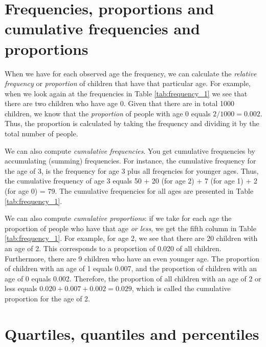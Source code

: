 \section{Frequencies, proportions and cumulative frequencies and proportions}


When we have for each observed age the frequency, we can calculate the \textit{relative frequency} or \textit{proportion} of children that have that particular age. For example, when we look again at the frequencies in Table \ref{tab:frequency_1} we see that there are two children who have age 0. Given that there are in total 1000 children, we know that the \textit{proportion} of people with age 0 equals $2/1000=0.002$. Thus, the proportion is calculated by taking the frequency and dividing it by the total number of people.


We can also compute \textit{cumulative frequencies}. You get cumulative frequencies by accumulating (summing) frequencies. For instance, the cumulative frequency for the age of 3, is the frequency for age 3 plus all freqencies for younger ages. Thus, the cumulative frequency of age 3 equals 50 + 20 (for age 2) + 7 (for age 1) + 2 (for age 0) = 79. The cumulative frequencies for all ages are presented in Table \ref{tab:frequency_1}.

We can also compute \textit{cumulative proportions}: if we take for each age the proportion of people who have that age \textit{or less}, we get the fifth column in Table \ref{tab:frequency_1}. For example, for age 2, we see that there are 20 children with an age of 2. This corresponds to a proportion of 0.020 of all children. Furthermore, there are 9 children who have an even younger age. The proportion of children with an age of 1 equals 0.007, and the proportion of children with an age of 0 equals 0.002. Therefore, the proportion of all children with an age of 2 or less equals $0.020+0.007+0.002=0.029$, which is called the cumulative proportion for the age of 2.



\section{Quartiles, quantiles and percentiles}

